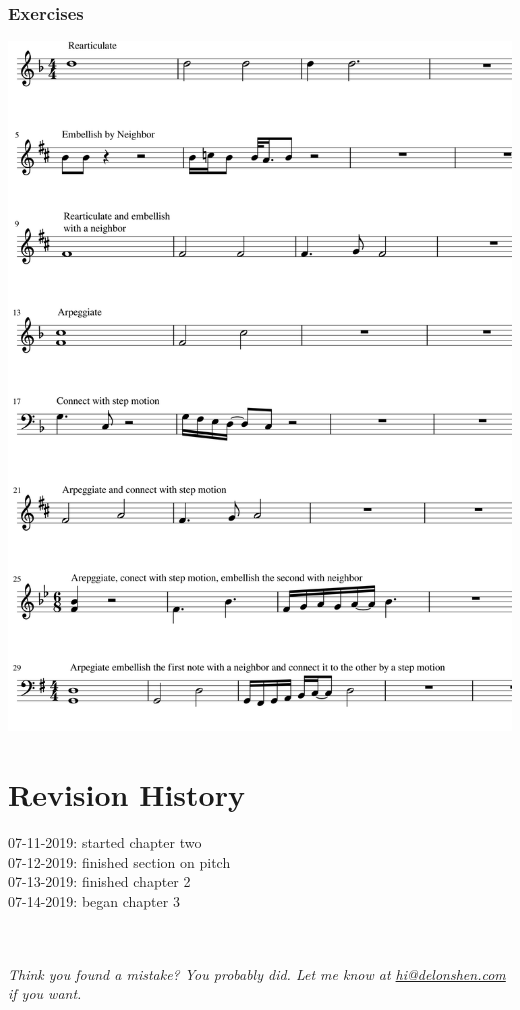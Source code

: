 \documentclass{article}
\begin{document}
\subsubsection{Exercises}
\begin{center}
  \includegraphics[width=\linewidth]{3exp.png}
\end{center}

{\tiny
\section{Revision History}
07-11-2019: started chapter two\\
07-12-2019: finished section on pitch\\
07-13-2019: finished chapter 2\\
07-14-2019: began chapter 3\\
}
\\\\
\textit{Think you found a mistake? You probably did. Let me know at \href{mailto:hi@delonshen.com}{hi@delonshen.com} if you want.}
\end{document}
